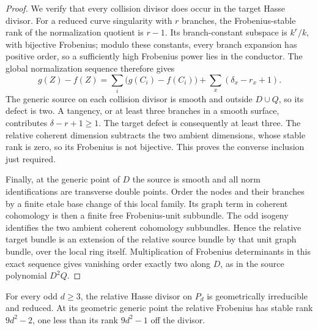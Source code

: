 \begin{proof}
We verify that every collision divisor does occur in the target
Hasse divisor. For a reduced curve singularity with $r$ branches,
the Frobenius-stable rank of the normalization quotient is $r-1$.
Its branch-constant subspace is $k^r/k$, with bijective Frobenius;
modulo these constants, every branch expansion has positive order,
so a sufficiently high Frobenius power lies in the conductor.
The global normalization sequence therefore gives
\[
 g(Z)-f(Z)=\sum_i\bigl(g(C_i)-f(C_i)\bigr)
                  +\sum_x(\delta_x-r_x+1).
\]
The generic source on each collision divisor is smooth and outside
$D\cup Q$, so its defect is two. A tangency, or at least three
branches in a smooth surface, contributes
$\delta-r+1\ge1$. The target defect is consequently at least
three. The relative coherent dimension subtracts the two ambient
dimensions, whose stable rank is zero, so its Frobenius is not
bijective. This proves the converse inclusion just required.

Finally, at the generic point of $D$ the source is smooth and all
norm identifications are transverse double points. Order the nodes
and their branches by a finite etale base change of this local
family. Its graph term in coherent cohomology is then a finite
free Frobenius-unit subbundle. The odd isogeny identifies the two
ambient coherent cohomology subbundles. Hence the relative target
bundle is an extension of the relative source bundle by that unit
graph bundle, over the local ring itself. Multiplication of
Frobenius determinants in this exact sequence gives vanishing
order exactly two along $D$, as in the source polynomial $D^2Q$.
\end{proof}

\begin{theorem}
\label{thm:ss-all-odd-Hasse}
For every odd $d\ge3$, the relative Hasse divisor on $P_d$ is
geometrically irreducible and reduced. At its geometric generic
point the relative Frobenius has stable rank $9d^2-2$,
one less than its rank $9d^2-1$ off the divisor.
\end{theorem}

